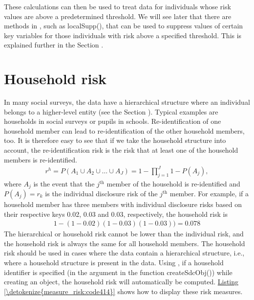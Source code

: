 \documentclass[letterpaper,10pt,english]{sphinxmanual}
\begin{document}
These calculations can then be used to treat data for individuals whose
risk values are above a predetermined threshold. We will see later that
there are methods in , such as localSupp(), that can be used
to suppress values of certain key variables for those individuals with
risk above a specified threshold. This is explained further in the Section
 .


\section{Household risk}
\label{\detokenize{measure_risk:household-risk}}
In many social surveys, the data have a hierarchical structure where an
individual belongs to a higher-level entity (see the Section
{\hyperref[\detokenize{measure_risk:levels-of-risk}]{}}). Typical
examples are households in social surveys or pupils in schools.
Re-identification of one household member can lead to re-identification
of the other household members, too. It is therefore easy to see that if
we take the household structure into account, the re-identification risk
is the risk that at least one of the household members is re-identified.
\begin{equation*}
\begin{split}r^{h} = P(A_{1} \cup A_{2} \cup … \cup A_{J}) = 1 - \prod_{j = 1}^{J}{1 - P(A_{j})},\end{split}
\end{equation*}
where \(A_{j}\) is the event that the \(j\)$^{\text{th}}$ member of
the household is re-identified and \(P\left( A_{j} \right) = r_{k}\)
is the individual disclosure risk of the \(j\)$^{\text{th}}$ member.
For example, if a household member has three members with individual
disclosure risks based on their respective keys 0.02, 0.03 and 0.03,
respectively, the household risk is
\begin{equation*}
\begin{split}1 - (1 - 0.02)(1 - 0.03)(1 - 0.03)) = 0.078\end{split}
\end{equation*}
The hierarchical or household risk cannot be lower than the individual
risk, and the household risk is always the same for all household
members. The household risk should be used in cases where the data
contain a hierarchical structure, i.e., where a household structure is
present in the data. Using , if a household identifier is
specified (in the argument  in the function createSdcObj()) while
creating an  object, the household risk will automatically be
computed. \hyperref[\detokenize{measure_risk:code414}]{Listing \ref{\detokenize{measure_risk:code414}}} shows how to display these risk measures.
\end{document}

